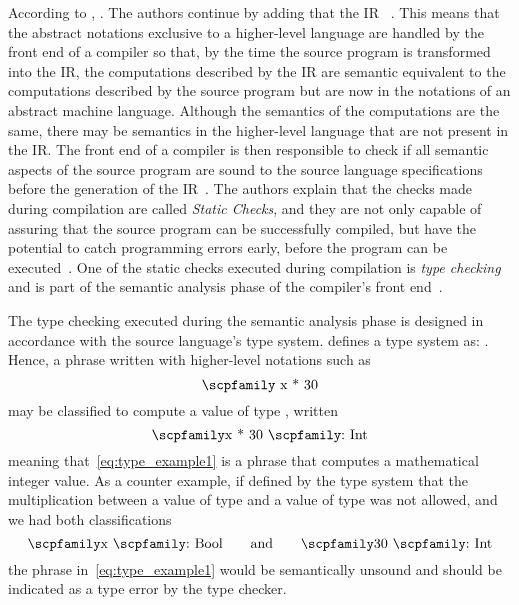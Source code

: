 \documentclass[
  oneside,
  english,
  coorientadorbanca,
  noabntexcite
]{ufsc-thesis-rn46-2019}
\newcommand{\codett}[1]{\text{\scpfamily#1}}
\newcommand{\code}[1]{\text{\scpfamily\setlength\spaceskip{0.35em}#1}}
\newcommand{\typer}[2]{\code{#1 \codett{:} #2}}
\begin{document}
According to \textcite{appel2003modern}, .
The authors continue by adding that the IR ~\cite{appel2003modern}.
This means that the abstract notations exclusive to a higher-level language are handled by the front end of a compiler so that, by the time the source program is transformed into the IR, the computations described by the IR are semantic equivalent to the computations described by the source program but are now in the notations of an abstract machine language.
Although the semantics of the computations are the same, there may be semantics in the higher-level language that are not present in the IR.\@
The front end of a compiler is then responsible to check if all semantic aspects of the source program are sound to the source language specifications before the generation of the IR~\cite{Aho:2006:CPT:1177220}.
The authors explain that the checks made during compilation are called \textit{Static Checks}, and they are not only capable of assuring that the source program can be successfully compiled, but have the potential to catch programming errors early, before the program can be executed~\cite{Aho:2006:CPT:1177220}. One of the static checks executed during compilation is \textit{type checking} and is part of the semantic analysis phase of the compiler's front end~\cite{appel2003modern}.

The type checking executed during the semantic analysis phase is designed in accordance with the source language's type system.
\textcite{pierce2002types} defines a type system as: .
Hence, a phrase written with higher-level notations such as
\begin{equation}\label{eq:type_example1}
  \codett{x * 30}
\end{equation}
may be classified to compute a value of type \codett{Int}, written
\begin{equation*}
  \typer{x * 30}{Int}
\end{equation*}
meaning that~\eqref{eq:type_example1} is a phrase that computes a mathematical integer value.
As a counter example, if defined by the type system that the multiplication between a value of type \codett{Bool} and a value of type \codett{Int} was not allowed, and we had both classifications
\begin{equation*}
  \typer{x}{Bool}
  \qquad
  \text{and}
  \qquad
  \typer{30}{Int}
\end{equation*}
the phrase in~\eqref{eq:type_example1} would be semantically unsound and should be indicated as a type error by the type checker.
\end{document}
